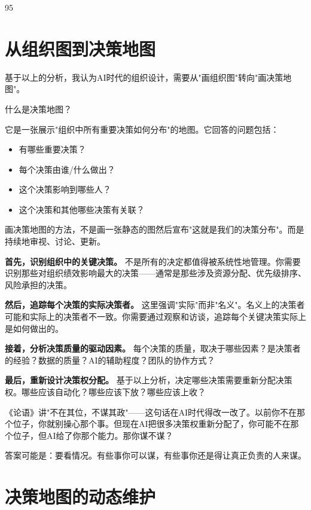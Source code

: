 95%

\section{从组织图到决策地图}


基于以上的分析，我认为AI时代的组织设计，需要从"画组织图"转向"画决策地图"。

什么是决策地图？

它是一张展示"组织中所有重要决策如何分布"的地图。它回答的问题包括：

\begin{itemize}
\item 有哪些重要决策？
\item 每个决策由谁/什么做出？
\item 这个决策影响到哪些人？
\item 这个决策和其他哪些决策有关联？

\end{itemize}
画决策地图的方法，不是画一张静态的图然后宣布"这就是我们的决策分布"。而是持续地审视、讨论、更新。

\textbf{首先，识别组织中的关键决策。} 不是所有的决定都值得被系统性地管理。你需要识别那些对组织绩效影响最大的决策——通常是那些涉及资源分配、优先级排序、风险承担的决策。

\textbf{然后，追踪每个决策的实际决策者。} 这里强调"实际"而非"名义"。名义上的决策者可能和实际上的决策者不一致。你需要通过观察和访谈，追踪每个关键决策实际上是如何做出的。

\textbf{接着，分析决策质量的驱动因素。} 每个决策的质量，取决于哪些因素？是决策者的经验？数据的质量？AI的辅助程度？团队的协作方式？

\textbf{最后，重新设计决策权分配。} 基于以上分析，决定哪些决策需要重新分配决策权。哪些应该自动化？哪些应该下放？哪些应该上收？

《论语》讲"不在其位，不谋其政"——这句话在AI时代得改一改了。以前你不在那个位子，你就别操心那个事。但现在AI把很多决策权重新分配了，你可能不在那个位子，但AI给了你那个能力。那你谋不谋？

答案可能是：要看情况。有些事你可以谋，有些事你还是得让真正负责的人来谋。

\section{决策地图的动态维护}


